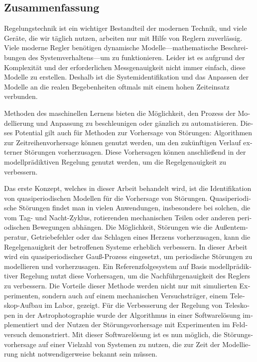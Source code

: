 \begin{otherlanguage}{ngerman}
\chapter*{Zusammenfassung}

Regelungstechnik ist ein wichtiger Bestandteil der modernen Technik, und viele
Geräte, die wir täglich nutzen, arbeiten nur mit Hilfe von Reglern zuverlässig.
Viele moderne Regler benötigen dynamische Modelle---mathematische
Beschreibungen des Systemverhaltens---um zu funktionieren. Leider ist es
aufgrund der Komplexität und der erforderlichen Messgenauigkeit nicht immer
einfach, diese Modelle zu erstellen. Deshalb ist die
Sys\-tem\-iden\-ti\-fi\-ka\-ti\-on und das Anpassen der Modelle an die realen
Begebenheiten oftmals mit einem hohen Zeiteinsatz verbunden.

Methoden des maschinellen Lernens bieten die Möglichkeit, den Prozess der
Modellierung und Anpassung zu beschleunigen oder gänzlich zu automatisieren.
Dieses Potential gilt auch für Methoden zur Vorhersage von Störungen:
Algorithmen zur Zeitreihenvorhersage können genutzt werden, um den zukünftigen
Verlauf externer Störungen vorherzusagen. Diese Vorhersagen können anschließend
in der modellprädiktiven Regelung genutzt werden, um die Regelgenauigkeit zu
verbessern.

Das erste Konzept, welches in dieser Arbeit behandelt wird, ist die
Identifikation von qua\-si\-pe\-ri\-o\-disch\-en Modellen für die Vorhersage
von Störungen. Quasiperiodische Störungen findet man in vielen Anwendungen,
insbesondere bei solchen, die vom Tag- und Nacht-Zyklus, rotierenden
mechanischen Teilen oder anderen periodischen Bewegungen abhängen. Die
Möglichkeit, Störungen wie die Außentemperatur, Getriebefehler oder das
Schlagen eines Herzens vorherzusagen, kann die Regelgenauigkeit der betroffenen
Systeme erheblich verbessern. In dieser Arbeit wird ein quasiperiodischer
Gauß-Prozess eingesetzt, um periodische Störungen zu modellieren und
vorherzusagen. Ein Referenzfolgesystem auf Basis modellprädiktiver Regelung
nutzt diese Vorhersagen, um die Nachführgenauigkeit des Reglers zu verbessern.
Die Vorteile dieser Methode werden nicht nur mit simulierten Experimenten,
sondern auch auf einem mechanischen Versuchsträger, einem Teleskop-Aufbau im
Labor, gezeigt. Für die Verbesserung der Regelung von Teleskopen in der
Astrophotographie wurde der Algorithmus in einer Softwarelösung implementiert
und der Nutzen der Störungsvorhersage mit Experimenten im Feldversuch
demonstriert. Mit dieser Softwarelösung ist es nun möglich, die
Störungsvorhersage auf einer Vielzahl von Systemen zu nutzen, die zur Zeit der
Modellierung nicht notwendigerweise bekannt sein müssen.


\end{otherlanguage}
